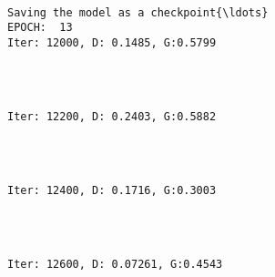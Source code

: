 \documentclass[11pt]{article}
\begin{document}
    \begin{Verbatim}[commandchars=\\\{\}]

Saving the model as a checkpoint{\ldots}
EPOCH:  13
Iter: 12000, D: 0.1485, G:0.5799
    \end{Verbatim}

    \begin{center}
    \end{center}
    { \hspace*{\fill} \\}
    
    \begin{Verbatim}[commandchars=\\\{\}]

Iter: 12200, D: 0.2403, G:0.5882
    \end{Verbatim}

    \begin{center}
    \end{center}
    { \hspace*{\fill} \\}
    
    \begin{Verbatim}[commandchars=\\\{\}]

Iter: 12400, D: 0.1716, G:0.3003
    \end{Verbatim}

    \begin{center}
    \end{center}
    { \hspace*{\fill} \\}
    
    \begin{Verbatim}[commandchars=\\\{\}]

Iter: 12600, D: 0.07261, G:0.4543
    \end{Verbatim}

    \begin{center}
    \end{center}
    { \hspace*{\fill} \\}
    
\end{document}
